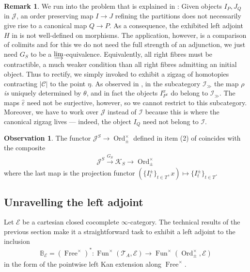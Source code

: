 \documentclass[12pt, reqno]{amsart}
\theoremstyle{plain}
\theoremstyle{definition}
\newtheorem{remark}[theorem]{Remark}
\newtheorem{observation}[theorem]{Observation}
\renewcommand{\epsilon}{\varepsilon}
\begin{document}
\begin{remark}
We run into the problem that is explained in : Given objects $I_P,J_Q$ in $\mathcal{J}$, an order preserving map $I\rightarrow J$ refining the partitions does not necessarily give rise to a canonical map $Q\rightarrow P$. As a consequence, the exhibited left adjoint $H$ in \cite{Yuan} is not well-defined on morphisms. The application, however, is a comparison of colimits and for this we do not need the full strength of an adjunction, we just need $G_S$ to be a $\varinjlim$-equivalence. Equivalently, all right fibres must be contractible, a much weaker condition than all right fibres admitting an initial object. Thus to rectify, we simply invoked  to exhibit a zigzag of homotopies contracting $|\mathcal{C}|$ to the point $\eta$. As observed in , in the subcategory $\mathcal{I}_\gg$ the map $\rho$ \textit{is} uniquely determined by $\theta$, and in fact the objects $I^x_{P^x}$ do belong to $\mathcal{I}_\gg$. The maps $\hat{\epsilon}$ need not be surjective, however, so we cannot restrict to this subcategory. Moreover, we have to work over $\mathcal{J}$ instead of $\mathcal{I}$ because this is where the canonical zigzag lives --- indeed, the object $I_Q$ need not belong to $\mathcal{I}$.
\end{remark}

\begin{observation}\label{JS to Ord}
The functor $\mathcal{J}^S\rightarrow \operatorname{Ord}_\pm^\times$ defined in item (2) of  coincides with the composite
\begin{align*}
\mathcal{J}^S\xrightarrow{G_S} \mathcal{K}_S\rightarrow \operatorname{Ord}_\pm^\times
\end{align*}
where the last map is the projection functor $(\{I_t^\pm\}_{t\in T}, x)\mapsto \{I_t^\pm\}_{t\in T}$.
\end{observation}

\subsection{Unravelling the left adjoint}\label{identifying the monoids}

Let $\mathcal{E}$ be a cartesian closed cocomplete $\infty$-category. The technical results of the previous section make it a straightforward task to exhibit a left adjoint to the inclusion
\begin{align*}
\mathbb{B}_{\mathcal{E}}=(\operatorname{Free}^\times)^*\colon \operatorname{Fun}^\times(\mathcal{T}_A,\mathcal{E})\rightarrow \operatorname{Fun}^\times( \operatorname{Ord}_\pm^\times, \mathcal{E})
\end{align*}
in the form of the pointwise left Kan extension along $\operatorname{Free}^\times$.
\end{document}
